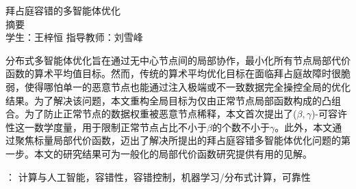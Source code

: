 \setcounter{page}{1}

\begin{center}
    {\heiti{} 拜占庭容错的多智能体优化} \\[2ex]   %
    {\heiti{} 摘要} \\[2ex]                         %
    {\normalfont{} 学生：王梓恒 \qquad 指导教师：刘雪峰} \\[2ex]  %
\end{center}

\noindent \quad \quad  分布式多智能体优化旨在通过无中心节点间的局部协作，最小化所有节点局部代价函数的算术平均值目标。然而，传统的算术平均优化目标在面临拜占庭故障时很脆弱，使得哪怕单一的恶意节点也能通过注入极端或不一致数据完全操控全局的优化结果。为了解决该问题，本文重构全局目标为仅由正常节点局部函数构成的凸组合。为了防止正常节点的数据权重被恶意节点稀释，本文首次提出了($\beta, \gamma$)-可容许性这一数学度量，用于限制正常节点占比不小于$\beta$的个数不小于$\gamma$。此外，本文通过聚焦标量局部代价函数，迈出了解决所提出的拜占庭容错多智能体优化问题的第一步。本文的研究结果可为一般化的局部代价函数研究提供有用的见解。

\vspace{1\baselineskip}
：{ 计算与人工智能，容错性，容错控制，机器学习/分布式计算，可靠性}
